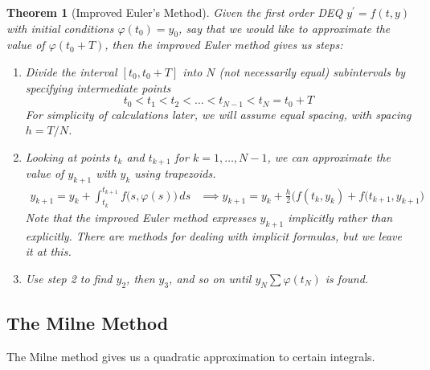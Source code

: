 \documentclass{article}
\newtheorem{theorem}{Theorem}[section]
\theoremstyle{remark}
\theoremstyle{definition}
\begin{document}
\begin{theorem}[Improved Euler's Method]
Given the first order DEQ $y^\prime = f(t, y)$ with initial conditions $\varphi(t_0) = y_0$, say that we would like to approximate the value of $\varphi(t_0 + T)$, then the \textit{improved Euler method} gives us steps: 
\begin{enumerate}
    \item Divide the interval $[t_0, t_0 + T]$ into $N$ (not necessarily equal) subintervals by specifying intermediate points 
    \[t_0 < t_1 < t_2 < \ldots < t_{N-1} < t_N = t_0 + T\]
    For simplicity of calculations later, we will assume equal spacing, with spacing $h = T/N$. 
    \item Looking at points $t_k$ and $t_{k+1}$ for $k = 1, \ldots, N-1$, we can approximate the value of $y_{k+1}$ with $y_k$ using trapezoids.
    \begin{align*}
        y_{k+1} = y_k + \int_{t_k}^{t_{k+1}} f\big( s, \varphi(s)\big)\,ds & \implies y_{k+1} = y_k + \frac{h}{2} \big(f(t_k, y_k) + f(t_{k+1}, y_{k+1}\big) 
    \end{align*}
    Note that the improved Euler method expresses $y_{k+1}$ implicitly rather than explicitly. There are methods for dealing with implicit formulas, but we leave it at this. 
    \item Use step 2 to find $y_2$, then $y_3$, and so on until $y_N \sum \varphi(t_N)$ is found. 
\end{enumerate}
\end{theorem}

\subsection{The Milne Method}
The Milne method gives us a quadratic approximation to certain integrals. 
\end{document}

